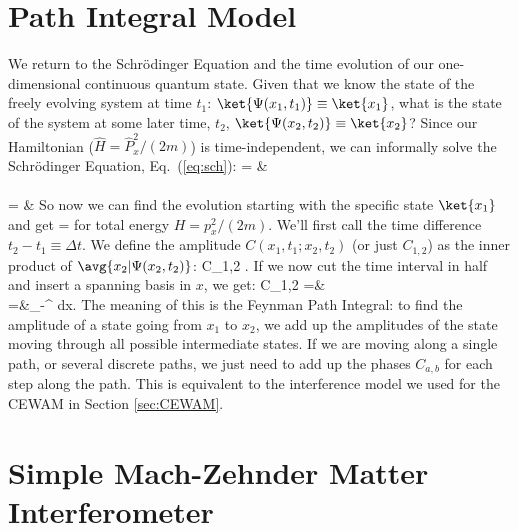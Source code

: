 \section{Path Integral Model}
\label{sec:pathIntegral}
We return to the Schr\"{o}dinger Equation and the time evolution of our one-dimensional continuous quantum state. Given that we know the state of the freely evolving system at time $t_1$: $\ket{\Psi(x_1,t_1)}\equiv\ket{x_1}$, what is the state of the system at some later time, $t_2$, $\ket{\Psi(x_2,t_2)}\equiv\ket{x_2}$? Since our Hamiltonian ($\hat{H} = \hat{P}_x^2/(2m)$) is time-independent, we can informally solve the  Schr\"{o}dinger Equation, Eq.~(\ref{eq:sch}):
\bas
\I \hbar {}\ket{\Psi} = &  \ket{\Psi} \\
\downarrow\\
 = &
\eas
So now we can find the evolution starting with the specific state $\ket{x_1}$ and get
\beq
{} = 
\eeq
for total energy $H = p_x^2/(2m)$. We'll first call the time difference $t_2 - t_1 \equiv \Delta t$. We define the amplitude $C(x_1,t_1;x_2,t_2)$ (or just $C_{1,2}$) as the inner product of $\avg{x_2|\Psi(x_2,t_2)}$:
\beq
C_{1,2} \equiv {} .
\eeq
If we now cut the time interval in half and insert a spanning basis in $x$, we get:
\bas
C_{1,2} =&   \\
=&\int\displaylimits_{-\infty}^{\infty} dx.\label{eq:pathintegral}
\eas
The meaning of this is the Feynman Path Integral: to find the amplitude of a state going from $x_1$ to $x_2$, we add up the amplitudes of the state moving through all possible intermediate states. If we are moving along a single path, or several discrete paths, we just need to add up the phases $C_{a,b}$ for each step along the path. This is equivalent to the interference model we used for the CEWAM in Section \ref{sec:CEWAM}.

\section{Simple Mach-Zehnder Matter Interferometer}

